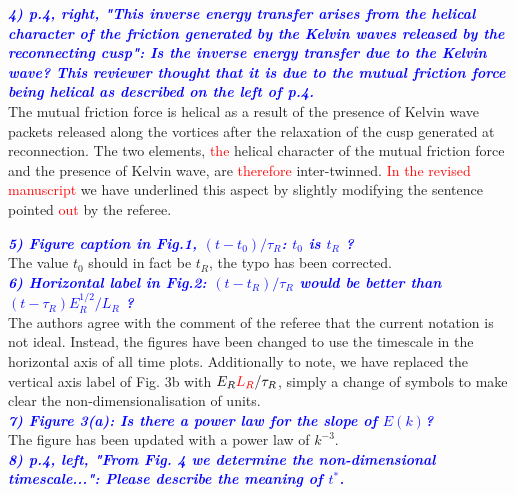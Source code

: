\documentclass[a4paper,10pt]{article}
\def\red#1{\textcolor{red}{#1}}
\def\blue#1{\textcolor{blue}{#1}}
\def\refcomment#1{\textbf{\blue{\emph{#1}}}\\}
\begin{document}
    \refcomment{4) p.4, right, "This inverse energy transfer arises from the helical
    character of the friction generated by the Kelvin waves released by
    the reconnecting cusp": Is the inverse energy transfer due to the
    Kelvin wave? This reviewer thought that it is due to the mutual
    friction force being helical as described on the left of p.4.}

    The mutual friction force is helical as a result of the presence of Kelvin wave packets released along the vortices after the relaxation of the cusp generated at reconnection. The two elements, \red{the} helical character 
of the mutual friction force and the presence of Kelvin wave, are 
\red{therefore} inter-twinned. \red{In the revised manuscript} we have 
underlined this aspect  by slightly modifying the sentence pointed \red{out}
by the referee.  
  
    \refcomment{5) Figure caption in Fig.1, $(t - t_0)/\tau_R$: $t_0$ is $t_R$ ?}

    The value $t_0$ should in fact be $t_R$, the typo has been corrected.\\
    
    \refcomment{6) Horizontal label in Fig.2: $(t - t_R)/\tau_R$ would be better than $(t- \tau_R)E_R^{1/2}/L_R$ ?}

    The authors agree with the comment of the referee that the current notation is not ideal. Instead, the figures have been changed to use the timescale in the horizontal axis of all time plots. Additionally to note, we have replaced the vertical axis label of Fig. 3b with $E_R \red{L_R}/\tau_R$, simply a change of symbols to make clear the non-dimensionalisation of units.\\
    
    \refcomment{7) Figure 3(a): Is there a power law for the slope of $E(k)$?}

    The figure has been updated with a power law of $k^{-3}$.\\
    
    \refcomment{8) p.4, left, "From Fig. 4 we determine the non-dimensional
    timescale...": Please describe the meaning of $t^*$.}
\end{document}
